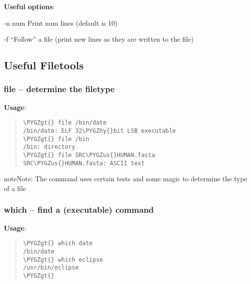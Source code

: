 \documentclass[a4paper,11pt,english]{sphinxmanual}
\def\PYGZus{\char`\_}
\def\PYGZgt{\char`\>}
\def\PYGZhy{\char`\-}
\begin{document}
\textbf{Useful options}:
\begin{optionlist}{3cm}
\item [-n num]  
Print num lines (default is 10)
\item [-f]  
``Follow'' a file (print new lines as they are written to the file)
\end{optionlist}


\subsection{Useful Filetools}
\label{introduction:useful-filetools}

\subsubsection{file – determine the filetype}
\label{introduction:file-determine-the-filetype}
\textbf{Usage}:  
\begin{quote}

\begin{Verbatim}[frame=single, rulecolor=\color{lightgray}, fontfamily=courier, commandchars=\\\{\}]
\PYGZgt{} file /bin/date
/bin/date: ELF 32\PYGZhy{}bit LSB executable
\PYGZgt{} file /bin
/bin: directory
\PYGZgt{} file SRC\PYGZus{}HUMAN.fasta
SRC\PYGZus{}HUMAN.fasta: ASCII text
\end{Verbatim}
\end{quote}

\begin{notice}{note}{Note:}
The command  uses certain tests and some magic to determine the type of a file
\end{notice}


\subsubsection{which – find a (executable) command}
\label{introduction:which-find-a-executable-command}
\textbf{Usage}:  
\begin{quote}

\begin{Verbatim}[frame=single, rulecolor=\color{lightgray}, fontfamily=courier, commandchars=\\\{\}]
\PYGZgt{} which date
/bin/date
\PYGZgt{} which eclipse
/usr/bin/eclipse
\PYGZgt{}
\end{Verbatim}
\end{quote}
\end{document}
